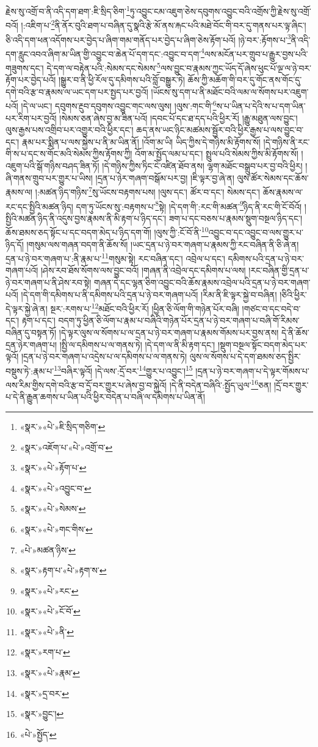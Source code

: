 རྗེས་སུ་འགྲོ་བ་ནི་འདི་དག་ཐག་:ཇི་སྲིད་ཅིག་\footnote{«སྣར་»«པེ་»ཇི་སྲིད་གཅིག་}ཏུ་འབྱུང་ངམ་འཇུག་ཅེས་དབུགས་འབྱུང་བའི་འགྲོས་ཀྱི་རྗེས་སུ་འགྲོ་བའོ། །:འཇིག་པ་\footnote{«སྣར་»འཇོག་པ་«པེ་»འགྲོ་བ་}ནི་ནོར་བུའི་ཐག་པ་བཞིན་དུ་སྣའི་རྩེ་མོ་ནས་རྐང་པའི་མཐེ་བོང་གི་བར་དུ་གནས་པར་ལྟ་ཞིང་། ཅི་འདི་དག་ཕན་འདོགས་པར་བྱེད་པ་ཞིག་གམ་གནོད་པར་བྱེད་པ་ཞིག་ཅེས་རྟོག་པའོ། །ཉེ་བར་:རྟོགས་པ་\footnote{«སྣར་»«པེ་»རྟོག་པ་}ནི་འདི་དག་རླུང་འབའ་ཞིག་མ་ཡིན་གྱི་འབྱུང་བ་ཆེན་པོ་དག་དང་:འབྱུང་བ་དག་\footnote{«སྣར་»«པེ་»འབྱུང་བ་}ལས་མངོན་པར་གྲུབ་པ་རྒྱུར་བྱས་པའི་གཟུགས་དང་། དེ་དག་ལ་བརྟེན་པའི་:སེམས་དང་སེམས་\footnote{«སྣར་»«པེ་»སེམས་}ལས་བྱུང་བ་རྣམས་ཀྱང་ཡོད་དོ་ཞེས་ཕུང་པོ་ལྔ་ལ་ཉེ་བར་རྟོག་པར་བྱེད་པའོ། །སྒྱུར་བ་ནི་ཕྱི་རོལ་དུ་དམིགས་པའི་བློ་བསྒྱུར་ཏེ། ཆོས་ཀྱི་མཆོག་གི་བར་དུ་གོང་ནས་གོང་དུ་དགེ་བའི་རྩ་བ་རྣམས་ལ་ཡང་དག་པར་སྤྱད་པར་བྱའོ། །ཡོངས་སུ་དག་པ་ནི་མཐོང་བའི་ལམ་ལ་སོགས་པར་འཇུག་པའོ། །དེ་ལ་ཡང་། དབུགས་རྔུབ་དབུགས་འབྱུང་གང་ལས་ལུས། །ལུས་:གང་གི་\footnote{«སྣར་»«པེ་»གང་གིས་}ས་པ་ཡིན་པ་དེའི་ས་པ་དག་ཡིན་པར་རིག་པར་བྱའོ། །སེམས་ཅན་ཞེས་བྱ་མ་ཟིན་པའོ། །དབང་པོ་དང་ཐ་དད་པའི་ཕྱིར་རོ། །རྒྱུ་མཐུན་ལས་བྱུང་། ལུས་རྒྱས་པས་འགྲིབ་པར་འགྱུར་བའི་ཕྱིར་དང་། ཆད་ནས་ཡང་ཉིང་མཚམས་སྦྱོར་བའི་ཕྱིར་རྒྱས་པ་ལས་བྱུང་བ་དང་། རྣམ་པར་སྨིན་པ་ལས་སྐྱེས་པ་ནི་མ་ཡིན་ནོ། །འོག་མ་ཡི། ཡིད་ཀྱིས་དེ་གཉིས་མི་རྟོགས་སོ། །དེ་གཉིས་ནི་རང་གི་ས་པ་དང་ས་གོང་མའི་སེམས་ཀྱིས་རྟོགས་ཀྱི། འོག་མ་སྤྱོད་ལམ་པ་དང་། སྤྲུལ་པའི་སེམས་ཀྱིས་མི་རྟོགས་སོ། །འཇུག་པའི་སྒོ་གཉིས་བཤད་ཟིན་ཏོ། །དེ་གཉིས་ཀྱིས་ཏིང་ངེ་འཛིན་ཐོབ་ནས། ལྷག་མཐོང་བསྒྲུབ་པར་བྱ་བའི་ཕྱིར། །ཞི་གནས་གྲུབ་པར་གྱུར་པ་ཡིས། །དྲན་པ་ཉེར་གཞག་བསྒོམ་པར་བྱ། །ཇི་ལྟར་བྱ་ཞེ་ན། ལུས་ཚོར་སེམས་དང་ཆོས་རྣམས་ལ། །:མཚན་ཉིད་གཉིས་\footnote{«པེ་»མཚན་ཉིས་}སུ་ཡོངས་བརྟགས་པས། །ལུས་དང་། ཚོར་བ་དང་། སེམས་དང་། ཆོས་རྣམས་ལ་རང་དང་སྤྱིའི་མཚན་ཉིད། དག་ཏུ་ཡོངས་སུ་:བརྟགས་པ་\footnote{«སྣར་»རྟག་པ་«པེ་»རྟག་ས་}སྟེ། །དེ་དག་གི་:རང་གི་མཚན་\footnote{«སྣར་»«པེ་»རང་}ཉིད་ནི་རང་གི་ངོ་བོའོ། །སྤྱིའི་མཚན་ཉིད་ནི་འདུས་བྱས་རྣམས་ནི་མི་རྟག་པ་ཉིད་དང་། ཟག་པ་དང་བཅས་པ་རྣམས་སྡུག་བསྔལ་ཉིད་དང་། ཆོས་ཐམས་ཅད་སྟོང་པ་དང་བདག་མེད་པ་ཉིད་དག་གོ། །ལུས་ཀྱི་:ངོ་བོ་ནི་\footnote{«སྣར་»«པེ་»ངོ་བོ་}འབྱུང་བ་དང་འབྱུང་བ་ལས་གྱུར་པ་ཉིད་དོ། །གསུམ་ལས་གཞན་བདག་ནི་ཆོས་སོ། །ཡང་དྲན་པ་ཉེ་བར་གཞག་པ་རྣམས་ཀྱི་རང་བཞིན་ནི་ཅི་ཞེ་ན། དྲན་པ་ཉེ་བར་གཞག་པ་:ནི་རྣམ་པ་\footnote{«སྣར་»«པེ་»ནི་}གསུམ་སྟེ། རང་བཞིན་དང་། འབྲེལ་པ་དང་། དམིགས་པའི་དྲན་པ་ཉེ་བར་གཞག་པའོ། །ཤེས་རབ་ཐོས་སོགས་ལས་བྱུང་བའོ། །གཞན་ནི་འབྲེལ་དང་དམིགས་པ་ལས། །རང་བཞིན་གྱི་དྲན་པ་ཉེ་བར་གཞག་པ་ནི་ཤེས་རབ་སྟེ། གཞན་དེ་དང་ལྷན་ཅིག་འབྱུང་བའི་ཆོས་རྣམས་འབྲེལ་པའི་དྲན་པ་ཉེ་བར་གཞག་པའོ། །དེ་དག་གི་དམིགས་པ་ནི་དམིགས་པའི་དྲན་པ་ཉེ་བར་གཞག་པའོ། །རིམ་ནི་ཇི་ལྟར་སྐྱེ་བ་བཞིན། །ཅིའི་ཕྱིར་དེ་ལྟར་སྐྱེ་ཞེ་ན། སྔར་:རགས་པ་\footnote{«སྣར་»རག་པ་}མཐོང་བའི་ཕྱིར་རོ། །ཕྱིན་ཅི་ལོག་གི་གཉེན་པོར་བཞི། །གཙང་བ་དང་བདེ་བ་དང་། རྟག་པ་དང་། བདག་ཏུ་ཕྱིན་ཅི་ལོག་པ་རྣམ་པ་བཞིའི་གཉེན་པོར་དྲན་པ་ཉེ་བར་གཞག་པ་བཞི་གོ་རིམས་བཞིན་དུ་བསྟན་ཏོ། །དེ་ལྟར་ལུས་ལ་སོགས་པ་ལ་དྲན་པ་ཉེ་བར་གཞག་པ་རྣམས་གོམས་པར་བྱས་ནས། དེ་ནི་ཆོས་དྲན་ཉེར་གཞག་པ། །སྤྱི་ལ་དམིགས་པ་ལ་གནས་ཏེ། །དེ་དག་ལ་ནི་མི་རྟག་དང་། །སྡུག་བསྔལ་སྟོང་བདག་མེད་པར་ལྟའོ། །དྲན་པ་ཉེ་བར་གཞག་པ་འདྲེས་པ་ལ་དམིགས་པ་ལ་གནས་ཏེ། ལུས་ལ་སོགས་པ་དེ་དག་ཐམས་ཅད་སྤྱིར་བསྡུས་ཏེ་:རྣམ་པ་\footnote{«སྣར་»«པེ་»རྣམ་}བཞིར་ལྟའོ། །དེ་ལས་:དྲོ་བར་\footnote{«སྣར་»དྲ་བར་}གྱུར་པ་འབྱུང་།\footnote{«སྣར་»བྱུང་།} །དྲན་པ་ཉེ་བར་གཞག་པ་དེ་ལྟར་གོམས་པ་ལས་རིམ་གྱིས་དགེ་བའི་རྩ་བ་དྲོ་བར་གྱུར་པ་ཞེས་བྱ་བ་སྐྱེའོ། །དེ་ནི་བདེན་བཞིའི་:སྤྱོད་ཡུལ་\footnote{«པེ་»སྤྱོད་}ཅན། །དྲོ་བར་གྱུར་པ་དེ་ནི་རྒྱུན་ཆགས་པ་ཡིན་པའི་ཕྱིར་བདེན་པ་བཞི་ལ་དམིགས་པ་ཡིན་ནོ། 